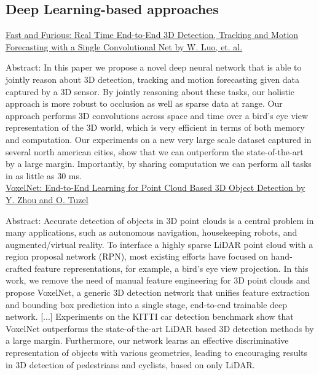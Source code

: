 \documentclass[11pt, a4paper]{article}
\begin{document}
\subsection{Deep Learning-based approaches}%
\label{sub:deep_learning_based_approaches}


\href{http://openaccess.thecvf.com/content_cvpr_2018/papers/Luo_Fast_and_Furious_CVPR_2018_paper.pdf}{Fast and Furious: Real Time End-to-End 3D Detection, Tracking and Motion Forecasting with a Single Convolutional Net by W. Luo, et. al.}

Abstract: In this paper we propose a novel deep neural network that is able to jointly reason about 3D detection, tracking and motion forecasting given data captured by a 3D sensor. By jointly reasoning about these tasks, our holistic approach is more robust to occlusion as well as sparse data at range. Our approach performs 3D convolutions across space and time over a bird’s eye view representation of the 3D world, which is very efficient in terms of both memory and computation. Our experiments on a new very large scale dataset captured in several north american cities, show that we can outperform the state-of-the-art by a large margin. Importantly, by sharing computation we can perform all tasks in as little as 30 ms. \\



\href{https://arxiv.org/abs/1711.06396}{VoxelNet: End-to-End Learning for Point Cloud Based 3D Object Detection by Y. Zhou and O. Tuzel}


Abstract: Accurate detection of objects in 3D point clouds is a central problem in many applications, such as autonomous navigation, housekeeping robots, and augmented/virtual reality. To interface a highly sparse LiDAR point cloud with a region proposal network (RPN), most existing efforts have focused on hand-crafted feature representations, for example, a bird's eye view projection. In this work, we remove the need of manual feature engineering for 3D point clouds and propose VoxelNet, a generic 3D detection network that unifies feature extraction and bounding box prediction into a single stage, end-to-end trainable deep network. [...] Experiments on the KITTI car detection benchmark show that VoxelNet outperforms the state-of-the-art LiDAR based 3D detection methods by a large margin. Furthermore, our network learns an effective discriminative representation of objects with various geometries, leading to encouraging results in 3D detection of pedestrians and cyclists, based on only LiDAR.\\
\end{document}
